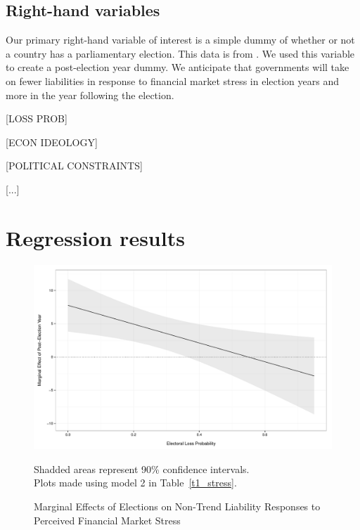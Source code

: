 \documentclass[]{article}
\begin{document}
\subsection*{Right-hand variables}

Our primary right-hand variable of interest is a simple dummy of whether or not a country has a parliamentary election. This data is from \cite{Kayser2015comp}. We used this variable to create a post-election year dummy. We anticipate that governments will take on fewer liabilities in response to financial market stress in election years and more in the year following the election.

[LOSS PROB]

[ECON IDEOLOGY]

[POLITICAL CONSTRAINTS]

[...]

\section{Regression results}

\begin{figure}
    \caption{Marginal Effects of Elections on Non-Trend Liability Responses to Perceived Financial Market Stress}
    \label{me_liab_stress}

    \begin{center}
        \includegraphics[scale=0.5]{analysis/figures/me_liab_stress.pdf}
    \end{center}

    {\scriptsize{Shadded areas represent 90\% confidence intervals. \\
    Plots made using model 2 in Table~\ref{t1_stress}.}}

\end{figure}
\end{document}
